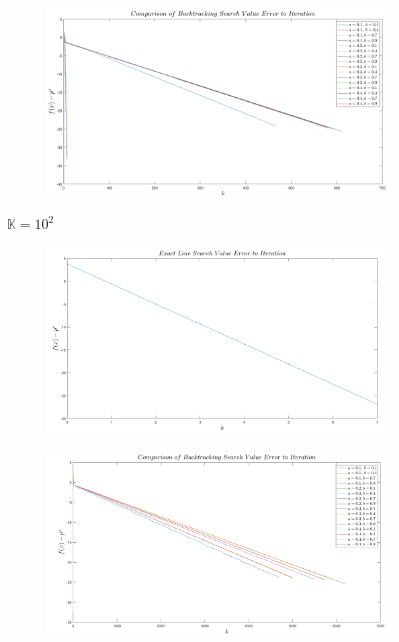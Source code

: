 \documentclass[12pt]{article}
\begin{document}
\begin{enumerate}
\begin{enumerate}
\begin{figure}
\begin{subfigure}[b]{0.45\textwidth}
				\end{subfigure}
				\hfill
				\begin{subfigure}[b]{0.45\textwidth}
					\centering
					\includegraphics[width=\textwidth]{4_1.png}
				\end{subfigure}
				\caption{$\mathbb{K}=10^2$}
			\end{figure}
			\begin{figure}
				\centering
				\begin{subfigure}[b]{0.45\textwidth}
					\centering
					\includegraphics[width=\textwidth]{5_4.png}
				\end{subfigure}
				\hfill
				\begin{subfigure}[b]{0.45\textwidth}
					\centering
					\includegraphics[width=\textwidth]{5_1.png}

\end{subfigure}
\end{figure}
\end{enumerate}
\end{enumerate}
\end{document}
